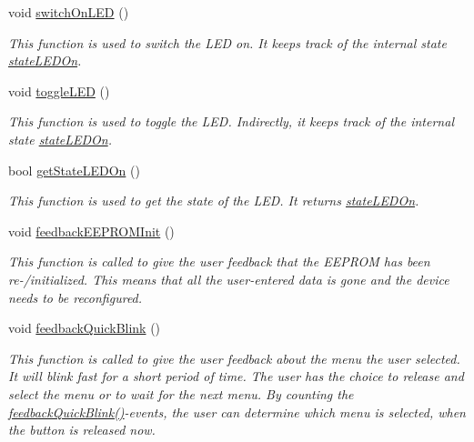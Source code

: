 \begin{DoxyCompactItemize}
void \hyperlink{WIFIOnOff_8ino_a46be1cdf6842e46fb3ba46a60f024aa0}{switch\-On\-L\-E\-D} ()
\begin{DoxyCompactList}\small\item\em This function is used to switch the L\-E\-D on. It keeps track of the internal state \hyperlink{WIFIOnOff_8ino_aa1ef40baec048d45fac1d51afc521d40}{state\-L\-E\-D\-On}. \end{DoxyCompactList}\item 
void \hyperlink{WIFIOnOff_8ino_aeaf97294d049f17c3eef4add9a4df1ec}{toggle\-L\-E\-D} ()
\begin{DoxyCompactList}\small\item\em This function is used to toggle the L\-E\-D. Indirectly, it keeps track of the internal state \hyperlink{WIFIOnOff_8ino_aa1ef40baec048d45fac1d51afc521d40}{state\-L\-E\-D\-On}. \end{DoxyCompactList}\item 
bool \hyperlink{WIFIOnOff_8ino_af4164c2bb2661c7427bd66ecd2f8aace}{get\-State\-L\-E\-D\-On} ()
\begin{DoxyCompactList}\small\item\em This function is used to get the state of the L\-E\-D. It returns \hyperlink{WIFIOnOff_8ino_aa1ef40baec048d45fac1d51afc521d40}{state\-L\-E\-D\-On}. \end{DoxyCompactList}\item 
void \hyperlink{WIFIOnOff_8ino_af43969e915aec75ff3f318d585e0606a}{feedback\-E\-E\-P\-R\-O\-M\-Init} ()
\begin{DoxyCompactList}\small\item\em This function is called to give the user feedback that the E\-E\-P\-R\-O\-M has been re-\//initialized. This means that all the user-\/entered data is gone and the device needs to be reconfigured. \end{DoxyCompactList}\item 
void \hyperlink{WIFIOnOff_8ino_aed631ac5d7f4338966a6a187e1057258}{feedback\-Quick\-Blink} ()
\begin{DoxyCompactList}\small\item\em This function is called to give the user feedback about the menu the user selected. It will blink fast for a short period of time. The user has the choice to release and select the menu or to wait for the next menu. By counting the \hyperlink{WIFIOnOff_8ino_aed631ac5d7f4338966a6a187e1057258}{feedback\-Quick\-Blink()}-\/events, the user can determine which menu is selected, when the button is released now. \end{DoxyCompactList}\item 

\end{DoxyCompactItemize}
